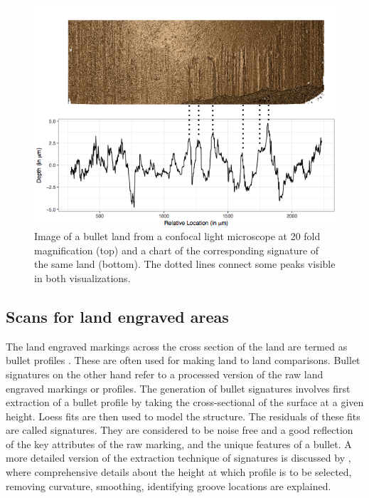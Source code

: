 \documentclass[12pt]{article}
\begin{document}
\begin{figure}
\centering
\includegraphics[width=\textwidth]{images/B6-B2-L6-rescaled.png}


\caption{\label{fig:rgl} Image of a bullet land from a confocal light microscope at 20 fold magnification (top) and a chart of the corresponding signature of the same land (bottom). The dotted lines connect some peaks visible in both visualizations.}

\end{figure}

\subsection{Scans for land engraved
areas}\label{scans-for-land-engraved-areas}

The land engraved markings across the cross section of the land are
termed as bullet profiles \citep{aoas,ma2004}. These are often used for
making land to land comparisons. Bullet signatures on the other hand
\citep{chu2013,aoas} refer to a processed version of the raw land
engraved markings or profiles. The generation of bullet signatures
involves first extraction of a bullet profile by taking the
cross-sectional of the surface at a given height. Loess fits are then
used to model the structure. The residuals of these fits are called
signatures. They are considered to be noise free and a good reflection
of the key attributes of the raw marking, and the unique features of a
bullet. A more detailed version of the extraction technique of
signatures is discussed by \citet{aoas}, where comprehensive details
about the height at which profile is to be selected, removing curvature,
smoothing, identifying groove locations are explained.
\end{document}
